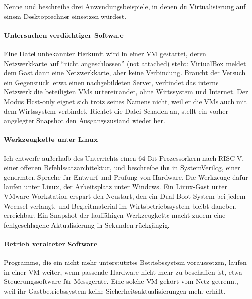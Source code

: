 \begin{aufgabe}
Nenne und beschreibe drei Anwendungsbeispiele, in denen du Virtualisierung auf einem Desktoprechner einsetzen würdest.
\end{aufgabe}
\label{sec:desktop}

\paragraph{Untersuchen verdächtiger Software} Eine Datei unbekannter Herkunft wird in einer VM gestartet, deren Netzwerkkarte auf \enquote{nicht angeschlossen} (not attached) steht: VirtualBox meldet dem Gast dann eine Netzwerkkarte, aber keine Verbindung. Braucht der Versuch ein Gegenstück, etwa einen nachgebildeten Server, verbindet das interne Netzwerk die beteiligten VMs untereinander, ohne Wirtssystem und Internet. Der Modus Host-only eignet sich trotz seines Namens nicht, weil er die VMs auch mit dem Wirtssystem verbindet. Richtet die Datei Schaden an, stellt ein vorher angelegter Snapshot den Ausgangszustand wieder her.

\paragraph{Werkzeugkette unter Linux} Ich entwerfe außerhalb des Unterrichts einen 64-Bit-Prozessorkern nach RISC-V, einer offenen Befehlssatzarchitektur, und beschreibe ihn in SystemVerilog, einer genormten Sprache für Entwurf und Prüfung von Hardware. Die Werkzeuge dafür laufen unter Linux, der Arbeitsplatz unter Windows. Ein Linux-Gast unter VMware Workstation erspart den Neustart, den ein Dual-Boot-System bei jedem Wechsel verlangt, und Begleitmaterial im Wirtsbetriebssystem bleibt daneben erreichbar. Ein Snapshot der lauffähigen Werkzeugkette macht zudem eine fehlgeschlagene Aktualisierung in Sekunden rückgängig.

\paragraph{Betrieb veralteter Software} Programme, die ein nicht mehr unterstütztes Betriebssystem voraussetzen, laufen in einer VM weiter, wenn passende Hardware nicht mehr zu beschaffen ist, etwa Steuerungssoftware für Messgeräte. Eine solche VM gehört vom Netz getrennt, weil ihr Gastbetriebssystem keine Sicherheitsaktualisierungen mehr erhält.

